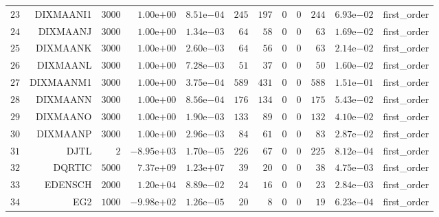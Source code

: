 \begin{longtable}{rrrrrrrrrrrr}
  \(    23\) & DIXMAANI1 & \(  3000\) & \( 1.00\)e\(+00\) & \( 8.51\)e\(-04\) & \(   245\) & \(   197\) & \(     0\) & \(     0\) & \(   244\) & \( 6.93\)e\(-02\) & first\_order \\
  \(    24\) & DIXMAANJ & \(  3000\) & \( 1.00\)e\(+00\) & \( 1.34\)e\(-03\) & \(    64\) & \(    58\) & \(     0\) & \(     0\) & \(    63\) & \( 1.69\)e\(-02\) & first\_order \\
  \(    25\) & DIXMAANK & \(  3000\) & \( 1.00\)e\(+00\) & \( 2.60\)e\(-03\) & \(    64\) & \(    56\) & \(     0\) & \(     0\) & \(    63\) & \( 2.14\)e\(-02\) & first\_order \\
  \(    26\) & DIXMAANL & \(  3000\) & \( 1.00\)e\(+00\) & \( 7.28\)e\(-03\) & \(    51\) & \(    37\) & \(     0\) & \(     0\) & \(    50\) & \( 1.60\)e\(-02\) & first\_order \\
  \(    27\) & DIXMAANM1 & \(  3000\) & \( 1.00\)e\(+00\) & \( 3.75\)e\(-04\) & \(   589\) & \(   431\) & \(     0\) & \(     0\) & \(   588\) & \( 1.51\)e\(-01\) & first\_order \\
  \(    28\) & DIXMAANN & \(  3000\) & \( 1.00\)e\(+00\) & \( 8.56\)e\(-04\) & \(   176\) & \(   134\) & \(     0\) & \(     0\) & \(   175\) & \( 5.43\)e\(-02\) & first\_order \\
  \(    29\) & DIXMAANO & \(  3000\) & \( 1.00\)e\(+00\) & \( 1.90\)e\(-03\) & \(   133\) & \(    89\) & \(     0\) & \(     0\) & \(   132\) & \( 4.10\)e\(-02\) & first\_order \\
  \(    30\) & DIXMAANP & \(  3000\) & \( 1.00\)e\(+00\) & \( 2.96\)e\(-03\) & \(    84\) & \(    61\) & \(     0\) & \(     0\) & \(    83\) & \( 2.87\)e\(-02\) & first\_order \\
  \(    31\) & DJTL & \(     2\) & \(-8.95\)e\(+03\) & \( 1.70\)e\(-05\) & \(   226\) & \(    67\) & \(     0\) & \(     0\) & \(   225\) & \( 8.12\)e\(-04\) & first\_order \\
  \(    32\) & DQRTIC & \(  5000\) & \( 7.37\)e\(+09\) & \( 1.23\)e\(+07\) & \(    39\) & \(    20\) & \(     0\) & \(     0\) & \(    38\) & \( 4.75\)e\(-03\) & first\_order \\
  \(    33\) & EDENSCH & \(  2000\) & \( 1.20\)e\(+04\) & \( 8.89\)e\(-02\) & \(    24\) & \(    16\) & \(     0\) & \(     0\) & \(    23\) & \( 2.84\)e\(-03\) & first\_order \\
  \(    34\) & EG2 & \(  1000\) & \(-9.98\)e\(+02\) & \( 1.26\)e\(-05\) & \(    20\) & \(     8\) & \(     0\) & \(     0\) & \(    19\) & \( 6.23\)e\(-04\) & first\_order \\

\end{longtable}
